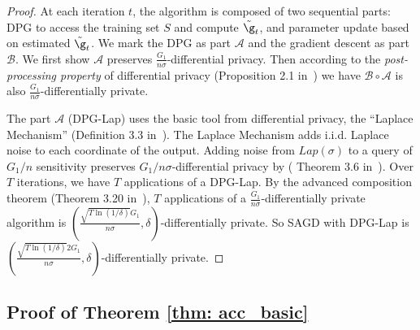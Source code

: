 \begin{proof}
At each iteration $t$, the algorithm is composed of two sequential parts: DPG to access the training set $S$ and compute $\tilde \g_t$, and parameter update based on estimated $\tilde \g_t$. We mark the DPG as part $\mathcal{A}$ and the gradient descent as part $\mathcal{B}$. We first show $\mathcal{A}$ preserves $\frac{G_1}{n\sigma}$-differential privacy. Then according to the \emph{post-processing property} of differential privacy (Proposition 2.1 in~\cite{dwro2014}) we have $\mathcal{B} \circ \mathcal{A}$ is also $\frac{G_1}{n\sigma}$-differentially private.
	
The part $\mathcal{A}$ (DPG-Lap) uses the basic tool from differential privacy, the ``Laplace Mechanism'' (Definition 3.3 in~\citep{dwro2014}). 
The Laplace Mechanism adds i.i.d. Laplace noise to each coordinate of the output. Adding noise from $Lap(\sigma)$ to a query of $G_1/n$
 sensitivity preserves $G_1/n\sigma$-differential privacy by ( Theorem 3.6 in~\cite{dwro2014}).
 Over $T$ iterations, we have $T$ applications of a DPG-Lap. By the advanced composition theorem (Theorem 3.20 in~\cite{dwro2014}), $T$ applications of a $\frac{G_1}{n\sigma}$-differentially private algorithm is $(\frac{\sqrt{T \ln(1/\delta)} G_1}{n\sigma}, \delta)$-differentially private. 
 So SAGD with DPG-Lap is $(\frac{\sqrt{T \ln(1/\delta)} 2G_1}{n\sigma}, \delta)$-differentially private.
\end{proof}

\subsection{Proof of Theorem \ref{thm: acc_basic}}

\theoaccbasic*


